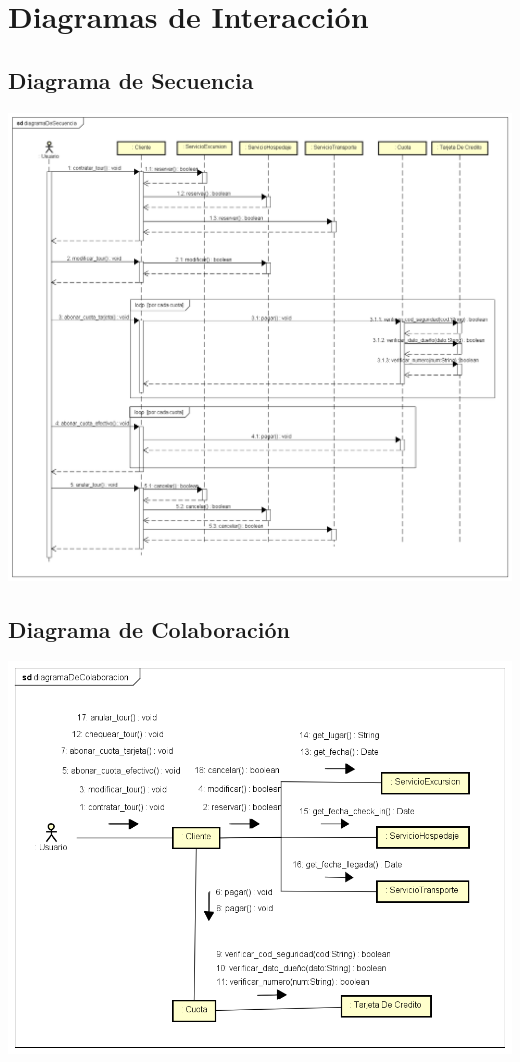 \documentclass[12pt,a4paper]{article}
\begin{document}
\section{Diagramas de Interacción}
	\subsection{Diagrama de Secuencia}
		\includegraphics[scale=0.45]{diagramaDeSecuencia.png}

	\subsection{Diagrama de Colaboración}
		\includegraphics[scale=0.7]{diagramaDeColaboracion.png}
\end{document}
